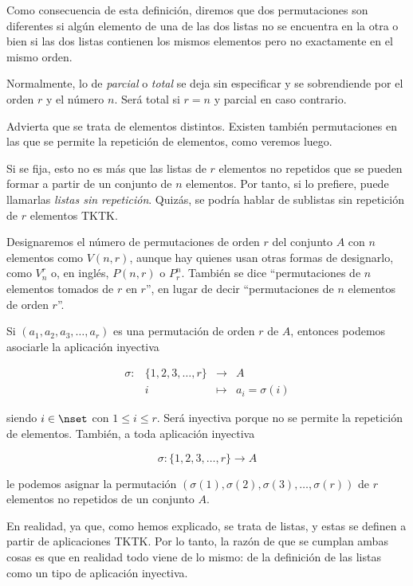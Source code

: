 Como consecuencia de esta definición, diremos que dos permutaciones son
diferentes si algún elemento de una de las dos listas no se encuentra en la
otra o bien si las dos listas contienen los mismos elementos pero no
exactamente en el mismo orden.

Normalmente, lo de \emph{parcial} o \emph{total} se deja sin especificar y se
sobrendiende por el orden $r$ y el número $n$. Será total si $r = n$ y
parcial en caso contrario.

Advierta que se trata de elementos distintos. Existen también permutaciones
en las que se permite la repetición de elementos, como veremos luego.

Si se fija, esto no es más que las listas de $r$ elementos no repetidos que
se pueden formar a partir de un conjunto de $n$ elementos. Por tanto, si lo
prefiere, puede llamarlas \emph{listas sin repetición}. Quizás, se podría
hablar de sublistas sin repetición de $r$ elementos TKTK.

Designaremos el número de permutaciones de orden $r$ del conjunto $A$ con $n$
elementos como $V(n, r)$, aunque hay quienes usan otras formas de
designarlo, como $V_n^r$ o, en inglés, $P(n, r)$ o $P_r^n$. También se dice
``permutaciones de $n$ elementos tomados de $r$ en $r$'', en lugar de decir
``permutaciones de $n$ elementos de orden $r$''.

Si $(a_1, a_2, a_3, \ldots, a_r)$ es una permutación de orden $r$ de $A$,
entonces podemos asociarle la aplicación inyectiva

\begin{equation*}
  \begin{array}{lrcl}
    \sigma:   & \{1, 2, 3, \ldots, r\}  & \longrightarrow & A     \\
              & i                       & \longmapsto     & a_i = \sigma(i)
  \end{array}
\end{equation*}

\noindent siendo $i \in \nset$ con $1 \leq i \leq r$. Será inyectiva porque
no se permite la repetición de elementos. También, a toda aplicación
inyectiva

$$ \sigma: \{1, 2, 3, \ldots, r\} \longrightarrow A $$

\noindent le podemos asignar la permutación $(\sigma(1), \sigma(2),
\sigma(3), \ldots, \sigma(r))$ de $r$ elementos no repetidos de un conjunto
$A$.

En realidad, ya que, como hemos explicado, se trata de listas, y estas se
definen a partir de aplicaciones TKTK. Por lo tanto, la razón de que se
cumplan ambas cosas es que en realidad todo viene de lo mismo: de la
definición de las listas como un tipo de aplicación inyectiva.

